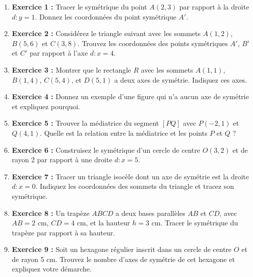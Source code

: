 \documentclass{article}
\begin{document}
\begin{tcolorbox}[colback=yellow!10!white, colframe=yellow!75!black, title=\textcolor{white}{Exercices}, sharp corners=south]
    \begin{enumerate}
        \item \textbf{Exercice 1 :} Tracer le symétrique du point \( A(2, 3) \) par rapport à la droite \( d: y = 1 \). Donnez les coordonnées du point symétrique \( A' \).
        
        \item \textbf{Exercice 2 :} Considérez le triangle suivant avec les sommets \( A(1, 2) \), \( B(5, 6) \) et \( C(3, 8) \). Trouvez les coordonnées des points symétriques \( A' \), \( B' \) et \( C' \) par rapport à l'axe \( d: x = 4 \).

        \item \textbf{Exercice 3 :} Montrer que le rectangle \( R \) avec les sommets \( A(1, 1) \), \( B(1, 4) \), \( C(5, 4) \), et \( D(5, 1) \) a deux axes de symétrie. Indiquez ces axes.

        \item \textbf{Exercice 4 :} Donnez un exemple d'une figure qui n'a aucun axe de symétrie et expliquez pourquoi.

        \item \textbf{Exercice 5 :} Trouver la médiatrice du segment \( [PQ] \) avec \( P(-2, 1) \) et \( Q(4, 1) \). Quelle est la relation entre la médiatrice et les points \( P \) et \( Q \) ?

        \item \textbf{Exercice 6 :} Construisez le symétrique d'un cercle de centre \( O(3, 2) \) et de rayon 2 par rapport à une droite \( d: x = 5 \).

        \item \textbf{Exercice 7 :} Tracer un triangle isocèle dont un axe de symétrie est la droite \( d: x = 0 \). Indiquez les coordonnées des sommets du triangle et tracez son symétrique.

        \item \textbf{Exercice 8 :} Un trapèze \( ABCD \) a deux bases parallèles \( AB \) et \( CD \), avec \( AB = 2 \) cm, \( CD = 4 \) cm, et la hauteur \( h = 3 \) cm. Tracer le symétrique du trapèze par rapport à sa hauteur.

        \item \textbf{Exercice 9 :} Soit un hexagone régulier inscrit dans un cercle de centre \( O \) et de rayon 5 cm. Trouvez le nombre d'axes de symétrie de cet hexagone et expliquez votre démarche.


\end{enumerate}
\end{tcolorbox}
\end{document}
